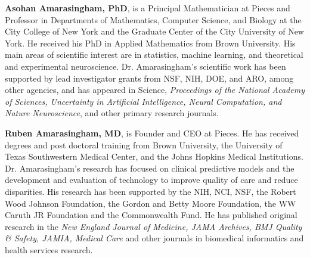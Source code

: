 \documentclass{style/myclass}
\begin{document}
\textbf{Asohan Amarasingham, PhD}, is a Principal Mathematician at Pieces and Professor in Departments of Mathematics, Computer Science, and Biology at the City College of New York and the Graduate Center of the City University of New York. He received his PhD in Applied Mathematics from Brown University. His main areas of scientific interest are in statistics, machine learning, and theoretical and experimental neuroscience. Dr. Amarasingham’s scientific work has been supported by lead investigator grants from NSF, NIH, DOE, and ARO, among other agencies, and has appeared in Science, \textit{Proceedings of the National Academy of Sciences, Uncertainty in Artificial Intelligence, Neural Computation, and Nature Neuroscience}, and other primary research journals.

\textbf{Ruben Amarasingham, MD}, is Founder and CEO at Pieces. He has received degrees and post doctoral training from Brown University, the University of Texas Southwestern Medical Center, and the Johns Hopkins Medical Institutions. Dr. Amarasingham’s research has focused on clinical predictive models and the development and evaluation of technology to improve quality of care and reduce disparities. His research has been supported by the NIH, NCI, NSF, the Robert Wood Johnson Foundation, the Gordon and Betty Moore Foundation, the WW Caruth JR Foundation and the Commonwealth Fund. He has published original research in the \textit{New England Journal of Medicine, JAMA Archives, BMJ Quality \& Safety, JAMIA, Medical Care} and other journals in biomedical informatics and health services research.

\printbibliography


\end{document}

